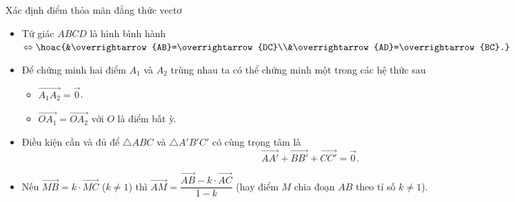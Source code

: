 \begin{dang}{Xác định điểm thỏa mãn đẳng thức vectơ}
\begin{note}
\begin{itemize}
\begin{itemize}
\begin{itemize}
					            \item  Với $I$ là trung điểm của cạnh $BC$ thì $\overrightarrow{AG}=\dfrac{2}{3}\overrightarrow{AI}$.
					            \item Với $O$ là điểm bất kì trong mặt phẳng thì: $3\overrightarrow{OG}=\overrightarrow{OA}+\overrightarrow{OB}+\overrightarrow{OC}$.
				            \end{itemize}
				      \item Tứ giác $ABCD$ là hình bình hành $\Leftrightarrow\hoac{&\overrightarrow{AB}=\overrightarrow{DC}\\&\overrightarrow{AD}=\overrightarrow{BC}.}$
				      \item Để chứng minh hai điểm $A_1$ và $A_2$ trùng nhau ta có thể chứng minh một trong các hệ thức sau
				            \begin{itemize}
					            \item $\overrightarrow{A_1A_2}=\overrightarrow{0}$.
					            \item $\overrightarrow{OA_1}=\overrightarrow{OA_2}$ với $O$ là điểm bất ỳ.
				            \end{itemize}
				      \item Điều kiện cần và đủ để $\triangle ABC$ và $\triangle A'B'C'$ có cùng trọng tâm là $$\overrightarrow{AA'}+\overrightarrow{BB'}+\overrightarrow{CC'}=\overrightarrow{0}.$$
				      \item Nếu $\overrightarrow{MB}=k\cdot\overrightarrow{MC}$ ($k\ne 1$) thì $\overrightarrow{AM}=\dfrac{\overrightarrow{AB}-k\cdot\overrightarrow{AC}}{1-k}$ (hay điểm $M$ chia đoạn $AB$ theo tỉ số $k\ne 1$).
			      \end{itemize}
		\end{itemize}
	\end{note}
\end{dang}
